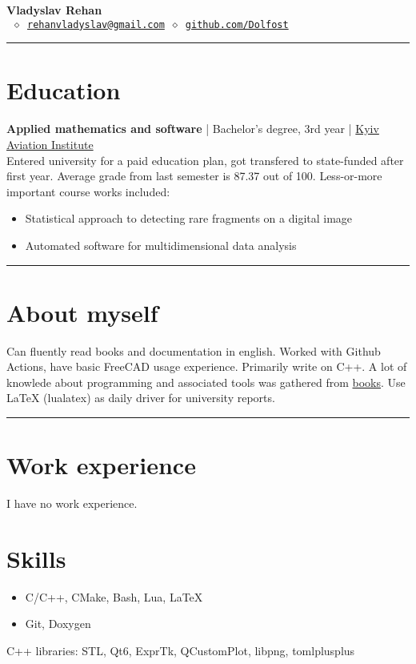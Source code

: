 



\newcommand{\crule}{\par\noindent\rule{\textwidth}{0.5pt}}


\thispagestyle{empty}

\begin{center}
	\LARGE \textbf{Vladyslav Rehan}\\[4mm] \normalsize
	\texttt{ \(\diamond\)\
	\href{mailto:rehanvladyslav@gmail.com}{rehanvladyslav@gmail.com} \(\diamond\)
	\url{github.com/Dolfost}}
\end{center}
\crule
\section{Education}
\textbf{Applied mathematics and software} | Bachelor's degree, 3rd year | \href{http://nau.edu.ua/en/}{Kyiv Aviation Institute}\\
Entered university for a paid education plan, got transfered to state-funded
after first year. Average grade from last semester is 87.37 out of 100.
Less-or-more important course works included:
\begin{itemize}
	\item Statistical approach to detecting rare fragments on a digital image
	\item Automated software for multidimensional data analysis
\end{itemize}

\crule
\section{About myself}
Can fluently read books and documentation in english. Worked with Github
Actions, have basic FreeCAD usage experience. Primarily write on C++. A lot of
knowlede about programming and associated tools was gathered from
\href{https://github.com/Dolfost/Dolfost/blob/main/README.md#literature--sources}{books}.
Use LaTeX (lualatex) as daily driver for university reports.

\crule
\section{Work experience}
I have no work experience.

\section{Skills}
\begin{itemize}
	\item C/C++, CMake, Bash, Lua, LaTeX
	\item Git, Doxygen
\end{itemize}
C++ libraries: STL, Qt6, ExprTk, QCustomPlot, libpng, tomlplusplus


